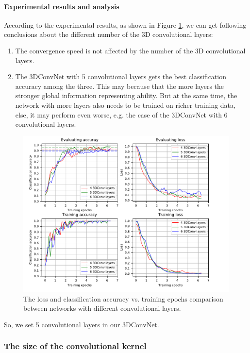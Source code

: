 \paragraph{Experimental results and analysis}
According to the experimental results, as shown in Figure \ref{fig:plot_layers}, we can get following conclusions about the different number of the 3D convolutional layers: 
\begin{enumerate}
	\item The convergence speed is not affected by the number of the 3D convolutional layers.
	\item The 3DConvNet with 5 convolutional layers gets the best classification accuracy among the three. This may because that the more layers the stronger global information representing ability. But at the same time, the network with more layers also needs to be trained on richer training data, else, it may perform even worse, e.g. the case of the 3DConvNet with 6 convolutional layers.
\end{enumerate}
\begin{figure}
	\includegraphics[trim=0cm 0cm 0cm 1cm]{fig01/plot_layers.pdf}
	\caption{The loss and classification accuracy vs. training epochs comparison between networks with different convolutional layers.}
	\label{fig:plot_layers}
\end{figure}

So, we set 5 convolutional layers in our 3DConvNet.


\subsubsection{The size of the convolutional kernel}
